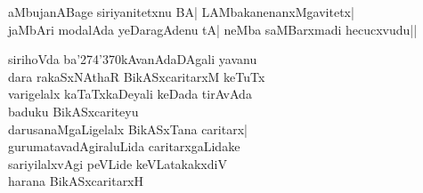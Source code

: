 \begin{entry}
\begin{shl}
aMbujanABage siriyanitetxnu BA| LAMbakanenanxMgavitetx|\\
jaMbAri modalAda yeDaragAdenu tA| neMba saMBarxmadi hecucxvudu||
\end{shl}
\end{entry}

\begin{entry}
\begin{shl}
sirihoVda ba\char'274\char'370kAvanAdaDAgali yavanu\\
dara rakaSxNAthaR BikASxcaritarxM keTuTx\\
varigelalx kaTaTxkaDeyali keDada tirAvAda\\
baduku BikASxcariteyu\\
darusanaMgaLigelalx BikASxTana caritarx|\\
gurumatavadAgiraluLida caritarxgaLidake\\
sariyilalxvAgi peVLide keVLatakakxdiV\\
harana BikASxcaritarxH
\end{shl}
\\
\end{entry}

